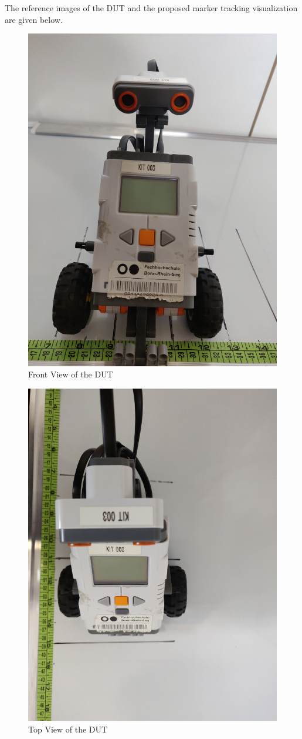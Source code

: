 \documentclass[10pt,a4paper]{article}
\begin{document}
\begin{enumerate}[label=\Roman*]
The reference images of the DUT and the proposed marker tracking visualization are given below.

\begin{figure}[h]
	\centering
\includegraphics[width=0.7\linewidth]{Front_view}
\caption{ Front View of the DUT}
\end{figure}

\begin{figure}[h]
	\centering
	\includegraphics[width=0.7\linewidth]{Top_view}
	\caption{ Top View of the DUT}
\end{figure}


\end{enumerate}
\end{document}
